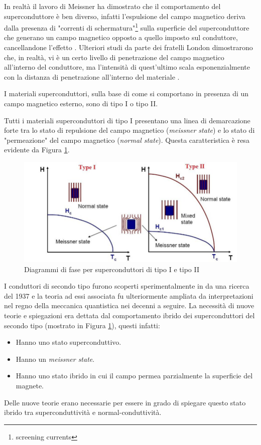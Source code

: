 \documentclass[a4paper,10pt]{article}
\begin{document}
In realtà il lavoro di Meissner ha dimostrato che il comportamento del superconduttore è ben
diverso, infatti l'espulsione del campo magnetico deriva dalla presenza di "correnti di
schermatura"\footnote{screening currents} sulla superficie del superconduttore che generano un
campo magnetico opposto a quello imposto sul conduttore, cancellandone
l'effetto \cite{super-fundamentals}. Ulteriori studi da parte dei fratelli London dimostrarono che,
in realtà, vi è un certo livello di penetrazione del campo magnetico all'interno del conduttore, ma
l'intensità di quest'ultimo scala esponenzialmente con la distanza di penetrazione all'interno del
materiale \cite{ssp}.

\bigskip
\noindent
I materiali superconduttori, sulla base di come si comportano in presenza di un campo magnetico
esterno, sono di tipo I o tipo II.

Tutti i materiali superconduttori di tipo I presentano una linea di demarcazione forte tra lo stato
di repulsione del campo magnetico (\emph{meissner state}) e lo stato di "permeazione" del campo
magnetico (\emph{normal state}). Questa caratteristica è resa evidente da Figura \ref{fig:phase-diagram}.
\begin{figure}[h!]
	\centering

	\includegraphics[scale=0.35]{fig/phase-diagram.jpg}
	\caption{
		Diagrammi di fase per superconduttori di tipo I e tipo
		II\cite{super-types}
	}\label{fig:phase-diagram}
\end{figure}

I conduttori di secondo tipo furono scoperti sperimentalmente in da una ricerca del 1937 \cite{type-2} e la teoria ad essi associata fu ulteriormente ampliata da interpretazioni nel regno della meccanica quantistica nei decenni a seguire. La necessità di nuove teorie e spiegazioni era dettata dal comportamento ibrido dei superconduttori del secondo tipo (mostrato in Figura \ref{fig:phase-diagram}), questi infatti:
\begin{itemize}
	\item Hanno uno stato superconduttivo.
	\item Hanno un \emph{meissner state}.
	\item Hanno uno stato ibrido in cui il campo permea parzialmente la superficie del magnete.
\end{itemize}
Delle nuove teorie erano necessarie per essere in grado di spiegare questo stato ibrido tra superconduttività e normal-conduttività.
\end{document}
